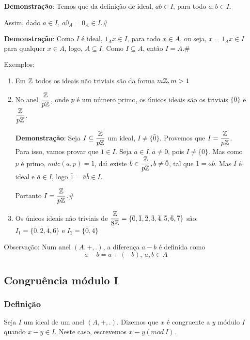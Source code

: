 \textbf{Demonstra{\c c}{\~a}o}: Temos que da defini{\c c}{\~a}o de ideal, $ab\in I$, para todo $a,b\in I$.

Assim, dado $a\in I,\ a0_{A}=0_{A}\in I$.\#

\textbf{Demonstra{\c c}{\~a}o}: Como $I$ {\'e} ideal, $1_{A}x\in I$, para todo $x\in A$, ou seja, $x=1_{A}x\in I$ para qualquer $x\in A$, logo, $A\subseteq I$. Como $I\subseteq A$, ent{\~a}o $I=A$.\#


Exemplos:
\begin{enumerate}
\item Em $\mathbb{Z}$ todos os ideais n{\~a}o triviais s{\~a}o da forma $m\mathbb{Z},m>1$
\item No anel $\displaystyle\frac{\mathbb{Z}}{p\mathbb{Z}}$, onde $p$ {\'e} um n{\'u}mero primo, os {\'u}nicos ideais  s{\~a}o os triviais $\{\bar{0}\}$ e $\displaystyle\frac{\mathbb{Z}}{p\mathbb{Z}}$.

\textbf{Demonstra{\c c}{\~a}o}: Seja $I\subseteq\displaystyle\frac{\mathbb{Z}}{p\mathbb{Z}}$ um ideal, $I\neq\{\bar{0}\}$. Provemos que 
$I=\displaystyle\frac{\mathbb{Z}}{p\mathbb{Z}}$. Para isso, vamos provar que $\bar{1}\in I$. Seja $\bar{a}\in I, \bar{a}\neq \bar{0}$, pois $I\neq\{\bar{0}\}$. Mas como $p$ {\'e} primo, $mdc(a,p)=1$, da{\'\i} existe $\bar{b}\in\displaystyle\frac{\mathbb{Z}}{p\mathbb{Z}},\bar{b}\neq\bar{0}$, tal que $\bar{1}=\bar{a}\bar{b}$. Mas $I$ {\'e} ideal e $\bar{a}\in I$, logo $\bar{1}=\bar{a}\bar{b}\in I$.

Portanto $I=\displaystyle\frac{\mathbb{Z}}{p\mathbb{Z}}$.\#
\item Os {\'u}nicos ideais n{\~a}o triviais de $\displaystyle\frac{\mathbb{Z}}{8\mathbb{Z}}=\{\bar{0},\bar{1},\bar{2},\bar{3},\bar{4},\bar{5},\bar{6},\bar{7}\}$ s{\~a}o:\\
$I_{1}=\{\bar{0},\bar{2},\bar{4},\bar{6}\}$ e $I_{2}=\{\bar{0},\bar{4}\}$ 

\end{enumerate}

Observa{\c c}{\~a}o: Num anel $(A,+,.)$, a diferen{\c c}a $a-b$ {\'e} definida como
\[a-b=a+(-b),\ a,b\in A\]

\subsection{Congru{\^e}ncia m{\'o}dulo I}
\subsubsection{Defini{\c c}{\~a}o}
\begin{definicao} Seja $I$ um ideal de um anel $(A,+,.)$. Dizemos que $x$ {\'e} congruente a $y$ m{\'o}dulo $I$ quando $x-y\in I$. Neste caso, escrevemos $x\equiv y(mod\ I)$.\end{definicao}


